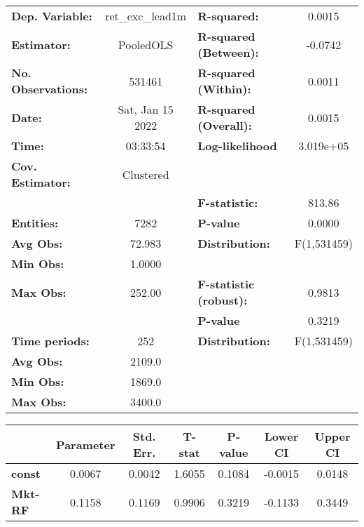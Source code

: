 \begin{center}
\begin{tabular}{lclc}
\toprule
\textbf{Dep. Variable:}    &  ret\_exc\_lead1m  & \textbf{  R-squared:         }   &      0.0015      \\
\textbf{Estimator:}        &     PooledOLS      & \textbf{  R-squared (Between):}  &     -0.0742      \\
\textbf{No. Observations:} &       531461       & \textbf{  R-squared (Within):}   &      0.0011      \\
\textbf{Date:}             &  Sat, Jan 15 2022  & \textbf{  R-squared (Overall):}  &      0.0015      \\
\textbf{Time:}             &      03:33:54      & \textbf{  Log-likelihood     }   &    3.019e+05     \\
\textbf{Cov. Estimator:}   &     Clustered      & \textbf{                     }   &                  \\
\textbf{}                  &                    & \textbf{  F-statistic:       }   &      813.86      \\
\textbf{Entities:}         &        7282        & \textbf{  P-value            }   &      0.0000      \\
\textbf{Avg Obs:}          &       72.983       & \textbf{  Distribution:      }   &   F(1,531459)    \\
\textbf{Min Obs:}          &       1.0000       & \textbf{                     }   &                  \\
\textbf{Max Obs:}          &       252.00       & \textbf{  F-statistic (robust):} &      0.9813      \\
\textbf{}                  &                    & \textbf{  P-value            }   &      0.3219      \\
\textbf{Time periods:}     &        252         & \textbf{  Distribution:      }   &   F(1,531459)    \\
\textbf{Avg Obs:}          &       2109.0       & \textbf{                     }   &                  \\
\textbf{Min Obs:}          &       1869.0       & \textbf{                     }   &                  \\
\textbf{Max Obs:}          &       3400.0       & \textbf{                     }   &                  \\
\bottomrule
\end{tabular}
\begin{tabular}{lcccccc}
                & \textbf{Parameter} & \textbf{Std. Err.} & \textbf{T-stat} & \textbf{P-value} & \textbf{Lower CI} & \textbf{Upper CI}  \\
\midrule
\textbf{const}  &       0.0067       &       0.0042       &      1.6055     &      0.1084      &      -0.0015      &       0.0148       \\
\textbf{Mkt-RF} &       0.1158       &       0.1169       &      0.9906     &      0.3219      &      -0.1133      &       0.3449       \\
\bottomrule
\end{tabular}
\end{center}
